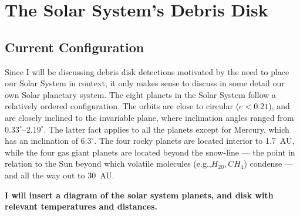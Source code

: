     
\section{The Solar System's Debris Disk}\label{sec:ch1_ssdisk}

     \subsection{Current Configuration}
    
    Since I will be discussing debris disk detections motivated by the need to place our Solar System in context, it only makes sense to discuss in some detail our own Solar planetary system. The eight planets in the Solar System follow a relatively ordered configuration. The orbits are close to circular ($e<0.21$), and are closely inclined to the invariable plane, where inclination angles ranged from $0.33^{\circ}$--$2.19^{\circ}$. The latter fact applies to all the planets except for Mercury, which has an inclination of $6.3^{\circ}$. The four rocky planets are located interior to 1.7~AU, while the four gas giant planets are located beyond the snow-line --- the point in relation to the Sun beyond which volatile molecules (e.g.,$H_20, CH_4$) condense --- and all the way out to 30~AU. 
    
    
    \textbf{I will insert a diagram of the solar system planets, and disk with relevant temperatures and distances.}
    
